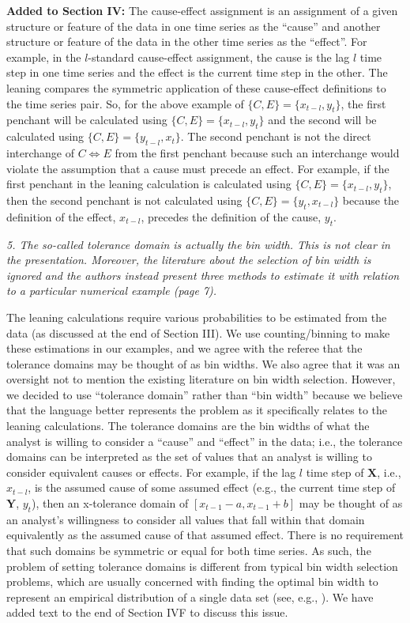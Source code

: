 \documentclass[a4paper,11pt]{article}
\begin{document}
{\bf Added to Section IV:} The cause-effect assignment is an assignment of a given structure or feature of the data in one time series as the ``cause'' and another structure or feature of the data in the other time series as the ``effect''.  For example, in the $l$-standard cause-effect assignment, the cause is the lag $l$ time step in one time series and the effect is the current time step in the other.  The leaning compares the symmetric application of these cause-effect definitions to the time series pair.  So, for the above example of $\{C,E\}=\{x_{t-l},y_t\}$, the first penchant will be calculated using $\{C,E\}=\{x_{t-l},y_t\}$ and the second will be calculated using $\{C,E\}=\{y_{t-l},x_t\}$.  The second penchant is not the direct interchange of $C\Leftrightarrow E$ from the first penchant because such an interchange would violate the assumption that a cause must precede an effect.  For example, if the first penchant in the leaning calculation is calculated using $\{C,E\}=\{x_{t-l},y_t\}$, then the second penchant is not calculated using $\{C,E\}=\{y_t,x_{t-l}\}$ because the definition of the effect, $x_{t-l}$, precedes the definition of the cause, $y_t$.

\vspace{0.5cm}
{\em 5. The so-called tolerance domain is actually the bin width. This is not clear in the presentation. Moreover, the literature about the selection of bin width is ignored and the authors instead present three methods to estimate it with relation to a particular numerical example (page 7).}
\vspace{0.5cm}

The leaning calculations require various probabilities to be estimated from the data (as discussed at the end of Section III).  We use counting/binning to make these estimations in our examples, and we agree with the referee that the tolerance domains may be thought of as bin widths.  We also agree that it was an oversight not to mention the existing literature on bin width selection.  However, we decided to use ``tolerance domain'' rather than ``bin width'' because we believe that the language better represents the problem as it specifically relates to the leaning calculations.  The tolerance domains are the bin widths of what the analyst is willing to consider a ``cause'' and ``effect'' in the data; i.e., the tolerance domains can be interpreted as the set of values that an analyst is willing to consider equivalent causes or effects.  For example, if the lag $l$ time step of $\mathbf{X}$, i.e., $x_{t-l}$, is the assumed cause of some assumed effect (e.g., the current time step of $\mathbf{Y}$, $y_t$), then an x-tolerance domain of $[x_{t-1}-a,x_{t-1}+b]$ may be thought of as an analyst's willingness to consider all values that fall within that domain equivalently as the assumed cause of that assumed effect.  There is no requirement that such domains be symmetric or equal for both time series.  As such, the problem of setting tolerance domains is different from typical bin width selection problems, which are usually concerned with finding the optimal bin width to represent an empirical distribution of a single data set (see, e.g., \cite{Wand1997}).  We have added text to the end of Section IVF to discuss this issue. 
\end{document}
